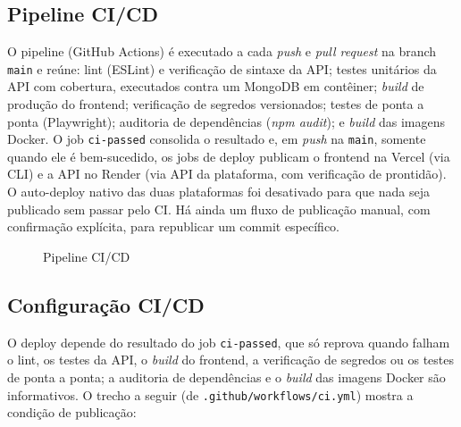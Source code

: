 \documentclass[11pt,a4paper]{article}
\begin{document}
\subsection{Pipeline CI/CD}
O pipeline (GitHub Actions) é executado a cada \textit{push} e \textit{pull request} na branch \texttt{main} e reúne: lint (ESLint) e verificação de sintaxe da API; testes unitários da API com cobertura, executados contra um MongoDB em contêiner; \textit{build} de produção do frontend; verificação de segredos versionados; testes de ponta a ponta (Playwright); auditoria de dependências (\textit{npm audit}); e \textit{build} das imagens Docker. O job \texttt{ci-passed} consolida o resultado e, em \textit{push} na \texttt{main}, somente quando ele é bem-sucedido, os jobs de deploy publicam o frontend na Vercel (via CLI) e a API no Render (via API da plataforma, com verificação de prontidão). O auto-deploy nativo das duas plataformas foi desativado para que nada seja publicado sem passar pelo CI. Há ainda um fluxo de publicação manual, com confirmação explícita, para republicar um commit específico.

\begin{figure}[H]
\centering
{}
\caption{Pipeline CI/CD}
\label{fig:cicd}
\end{figure}

\subsection{Configuração CI/CD}
O deploy depende do resultado do job \texttt{ci-passed}, que só reprova quando falham o lint, os testes da API, o \textit{build} do frontend, a verificação de segredos ou os testes de ponta a ponta; a auditoria de dependências e o \textit{build} das imagens Docker são informativos. O trecho a seguir (de \texttt{.github/workflows/ci.yml}) mostra a condição de publicação:
\end{document}
